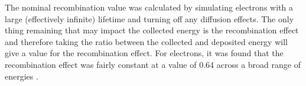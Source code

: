 The nominal recombination value was calculated by simulating electrons with a large (effectively infinite) lifetime and turning off any diffusion effects. The only thing remaining that may impact the collected energy is the recombination effect and therefore taking the ratio between the collected and deposited energy will give a value for the recombination effect. For electrons, it was found that the recombination effect was fairly constant at a value of 0.64 across a broad range of energies \cite{recombination_0.64}. 

